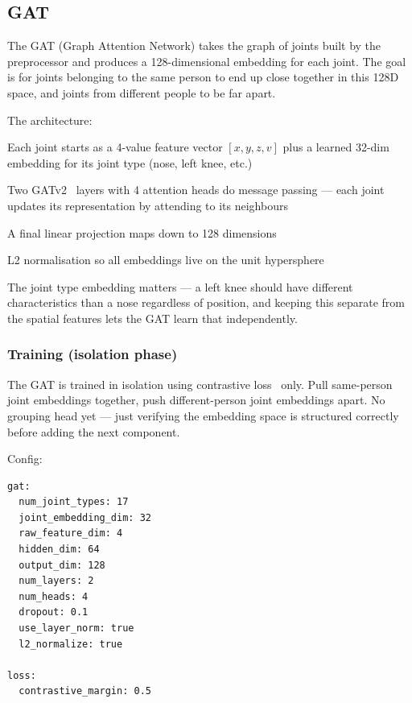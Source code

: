 \subsection{GAT}

The GAT (Graph Attention Network) takes the graph of joints built by the preprocessor and produces a 128-dimensional embedding for each joint. The goal is for joints belonging to the same person to end up close together in this 128D space, and joints from different people to be far apart.

The architecture:
\begin{compactitem}
  \item Each joint starts as a 4-value feature vector $[x, y, z, v]$ plus a learned 32-dim embedding for its joint type (nose, left knee, etc.)
  \item Two GATv2~\cite{brody2022gatv2} layers with 4 attention heads do message passing --- each joint updates its representation by attending to its neighbours
  \item A final linear projection maps down to 128 dimensions
  \item L2 normalisation so all embeddings live on the unit hypersphere
\end{compactitem}

The joint type embedding matters --- a left knee should have different characteristics than a nose regardless of position, and keeping this separate from the spatial features lets the GAT learn that independently.


\subsubsection{Training (isolation phase)}

The GAT is trained in isolation using contrastive loss~\cite{chopra2005contrastive} only. Pull same-person joint embeddings together, push different-person joint embeddings apart. No grouping head yet --- just verifying the embedding space is structured correctly before adding the next component.

Config:
\begin{verbatim}
gat:
  num_joint_types: 17
  joint_embedding_dim: 32
  raw_feature_dim: 4
  hidden_dim: 64
  output_dim: 128
  num_layers: 2
  num_heads: 4
  dropout: 0.1
  use_layer_norm: true
  l2_normalize: true

loss:
  contrastive_margin: 0.5
\end{verbatim}


